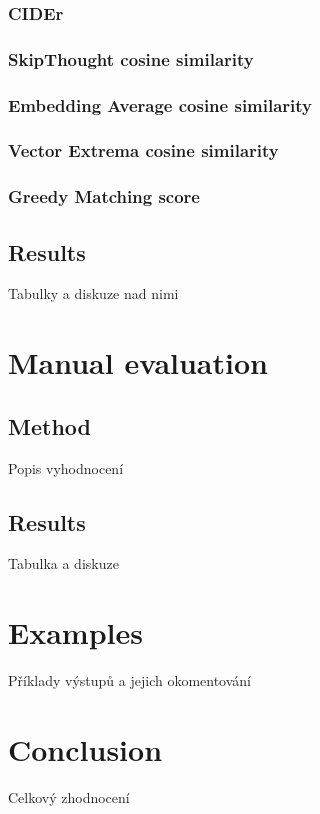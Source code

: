 \subsubsection*{CIDEr}
\subsubsection*{SkipThought cosine similarity}
\subsubsection*{Embedding Average cosine similarity}
\subsubsection*{Vector Extrema cosine similarity}
\subsubsection*{Greedy Matching score}

\subsection{Results}
Tabulky a diskuze nad nimi

\section{Manual evaluation}
\subsection{Method}
Popis vyhodnocení
\subsection{Results}
Tabulka a diskuze

\section{Examples}
Příklady výstupů a jejich okomentování

\section{Conclusion}
Celkový zhodnocení